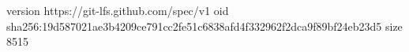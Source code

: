 version https://git-lfs.github.com/spec/v1
oid sha256:19d587021ae3b4209ce791cc2fe51c6838afd4f332962f2dca9f89bf24eb23d5
size 8515

